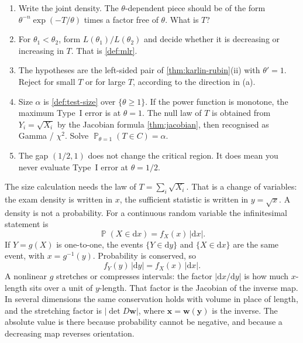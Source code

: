 \documentclass[11pt,a4paper]{article}
\DeclareMathOperator{\Pbb}{\mathbb{P}}
\begin{document}
\begin{remark}
\label{rem:p7-hints}
\begin{enumerate}[label=\textup{(\arabic*)}]
    \item
    Write the joint density. The \(\theta\)-dependent piece should be of the form \(\theta^{-n}\exp(-T/\theta)\) times a factor free of \(\theta\). What is \(T\)?
    \item
    For \(\theta_1<\theta_2\), form \(L(\theta_1)/L(\theta_2)\) and decide whether it is decreasing or increasing in \(T\). That is \cref{def:mlr}.
    \item
    The hypotheses are the left-sided pair of \cref{thm:karlin-rubin}(ii) with \(\theta'=1\). Reject for small \(T\) or for large \(T\), according to the direction in (a).
    \item
    Size \(\alpha\) is \cref{def:test-size} over \(\{\theta\ge 1\}\). If the power function is monotone, the maximum Type~I error is at \(\theta=1\). The null law of \(T\) is obtained from \(Y_i=\sqrt{X_i}\) by the Jacobian formula \cref{thm:jacobian}, then recognised as Gamma / \(\chi^{2}\). Solve \(\Pbb_{\theta=1}(T\in C)=\alpha\).
    \item
    The gap \((1/2,1)\) does not change the critical region. It does mean you never evaluate Type~I error at \(\theta=1/2\).
\end{enumerate}
\end{remark}

The size calculation needs the law of \(T=\sum_i\sqrt{X_i}\). That is a change of variables: the exam density is written in \(x\), the sufficient statistic is written in \(y=\sqrt{x}\). A density is not a probability. For a continuous random variable the infinitesimal statement is
\[
\Pbb(X\in\mathrm{d}x)
=
f_X(x)\,|\mathrm{d}x|.
\]
If \(Y=g(X)\) is one-to-one, the events \(\{Y\in\mathrm{d}y\}\) and \(\{X\in\mathrm{d}x\}\) are the same event, with \(x=g^{-1}(y)\). Probability is conserved, so
\[
f_Y(y)\,|\mathrm{d}y|
=
f_X(x)\,|\mathrm{d}x|.
\]
A nonlinear \(g\) stretches or compresses intervals: the factor \(|\mathrm{d}x/\mathrm{d}y|\) is how much \(x\)-length sits over a unit of \(y\)-length. That factor is the Jacobian of the inverse map. In several dimensions the same conservation holds with volume in place of length, and the stretching factor is \(|\det D\mathbf{w}|\), where \(\mathbf{x}=\mathbf{w}(\mathbf{y})\) is the inverse. The absolute value is there because probability cannot be negative, and because a decreasing map reverses orientation.
\end{document}
